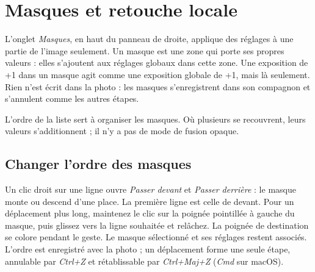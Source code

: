 \chapter{Masques et retouche locale}
L’onglet \emph{Masques}, en haut du panneau de droite, applique des réglages à une partie de
l’image seulement. Un masque est une zone qui porte ses propres valeurs : elles s’ajoutent aux
réglages globaux dans cette zone. Une exposition de +1 dans un masque agit comme une exposition
globale de +1, mais là seulement. Rien n’est écrit dans la photo : les masques s’enregistrent dans
son compagnon et s’annulent comme les autres étapes.

L’ordre de la liste sert à organiser les masques. Où plusieurs se recouvrent, leurs valeurs
s’additionnent ; il n’y a pas de mode de fusion opaque.

\section{Changer l’ordre des masques}
Un clic droit sur une ligne ouvre \emph{Passer devant} et \emph{Passer derrière} : le masque
monte ou descend d’une place. La première ligne est celle de devant. Pour un déplacement plus
long, maintenez le clic sur la poignée pointillée à gauche du masque, puis glissez vers la ligne
souhaitée et relâchez. La poignée de destination se colore pendant le geste. Le masque sélectionné
et ses réglages restent associés. L’ordre est enregistré avec la photo ; un déplacement forme
une seule étape, annulable par \emph{Ctrl+Z} et rétablissable par \emph{Ctrl+Maj+Z}
(\emph{Cmd} sur macOS).


